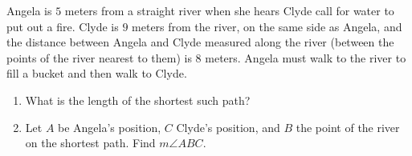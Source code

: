 Angela is $5$ meters from a straight river when she hears Clyde call for water to put out a fire. Clyde is $9$ meters from the river, on the same side as Angela, and the distance between Angela and Clyde measured along the river (between the points of the river nearest to them) is $8$ meters. Angela must walk to the river to fill a bucket and then walk to Clyde.
\begin{enumerate}
\item[(a)] What is the length of the shortest such path?
\item[(b)] Let $A$ be Angela's position, $C$ Clyde's position, and $B$ the point of the river on the shortest path. Find $m\angle ABC$.
\end{enumerate}
